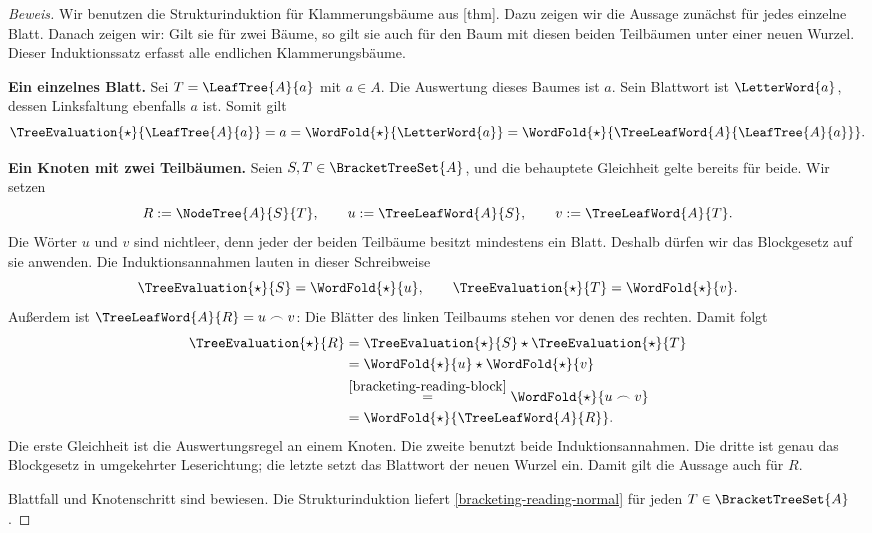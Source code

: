 \begin{proof}[Beweis]
Wir benutzen die Strukturinduktion für Klammerungsbäume aus
[thm].
Dazu zeigen wir die Aussage zunächst für jedes einzelne Blatt.
Danach zeigen wir: Gilt sie für zwei Bäume, so gilt sie auch für den
Baum mit diesen beiden Teilbäumen unter einer neuen Wurzel.
Dieser Induktionssatz erfasst alle endlichen Klammerungsbäume.

\par{}
\medskip\noindent\textbf{Ein einzelnes Blatt.}
Sei \(T=\LeafTree{A}{a}\) mit \(a\in A\). Die Auswertung
dieses Baumes ist \(a\). Sein Blattwort ist \(\LetterWord{a}\),
dessen Linksfaltung ebenfalls \(a\) ist. Somit gilt
\[
  \TreeEvaluation{\star}{\LeafTree{A}{a}}
    =a
    =\WordFold{\star}{\LetterWord{a}}
    =\WordFold{\star}{\TreeLeafWord{A}{\LeafTree{A}{a}}}.
\]

\medskip\noindent\textbf{Ein Knoten mit zwei Teilbäumen.}
Seien \(S,T\in\BracketTreeSet{A}\), und die behauptete
Gleichheit gelte bereits für beide. Wir setzen
\[
  R:=\NodeTree{A}{S}{T},\qquad
  u:=\TreeLeafWord{A}{S},\qquad
  v:=\TreeLeafWord{A}{T}.
\]
Die Wörter \(u\) und \(v\) sind nichtleer, denn jeder der
beiden Teilbäume besitzt mindestens ein Blatt. Deshalb dürfen wir
das Blockgesetz auf sie anwenden. Die Induktionsannahmen lauten
in dieser Schreibweise
\[
  \TreeEvaluation{\star}{S}=\WordFold{\star}{u},
  \qquad
  \TreeEvaluation{\star}{T}=\WordFold{\star}{v}.
\]
Außerdem ist \(\TreeLeafWord{A}{R}=u\frown v\): Die Blätter
des linken Teilbaums stehen vor denen des rechten. Damit folgt
\[
  \begin{aligned}
    \TreeEvaluation{\star}{R}
      &=\TreeEvaluation{\star}{S}\star\TreeEvaluation{\star}{T}\\
      &=\WordFold{\star}{u}\star\WordFold{\star}{v}\\
      &\overset{\eqref{bracketing-reading-block}}{=}
        \WordFold{\star}{u\frown v}\\
      &=\WordFold{\star}{\TreeLeafWord{A}{R}}.
  \end{aligned}
\]
Die erste Gleichheit ist die Auswertungsregel an einem Knoten.
Die zweite benutzt beide Induktionsannahmen. Die dritte ist genau
das Blockgesetz in umgekehrter Leserichtung; die letzte setzt das
Blattwort der neuen Wurzel ein. Damit gilt die Aussage auch für \(R\).

Blattfall und Knotenschritt sind bewiesen. Die Strukturinduktion
liefert \eqref{bracketing-reading-normal} für jeden
\(T\in\BracketTreeSet{A}\).
\end{proof}

